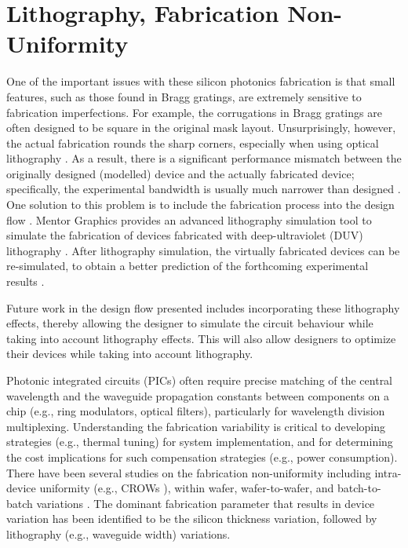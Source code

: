\documentclass[journal]{spie}
\begin{document}
\section{Lithography, Fabrication Non-Uniformity}


One of the important issues with these silicon photonics fabrication is that small features, such as those found in Bragg gratings, are extremely sensitive to fabrication imperfections. For example, the corrugations in Bragg gratings are often designed to be square in the original mask layout. Unsurprisingly, however, the actual fabrication rounds the sharp corners, especially when using optical lithography \cite{wang2011uniform}. As a result, there is a significant performance mismatch between the originally designed (modelled) device and the actually fabricated device; specifically, the experimental bandwidth is usually much narrower than designed \cite{wang2011uniform}.    One solution to this problem is to include the fabrication process into the design flow \cite{bogaerts2008closed-loop}. Mentor Graphics provides an advanced lithography simulation tool to simulate the fabrication of devices fabricated with deep-ultraviolet (DUV) lithography \cite{adam2003improved}. After lithography simulation, the virtually fabricated devices can be re-simulated, to obtain a better prediction of the forthcoming experimental results \cite{wang2012lithography}.  

Future work in the design flow presented includes incorporating these lithography effects, thereby allowing the designer to simulate the circuit behaviour while taking into account lithography effects.  This will also allow designers to optimize their devices while taking into account lithography.

Photonic integrated circuits (PICs) often require precise matching of the central wavelength and the waveguide propagation constants between components on a chip (e.g., ring modulators, optical filters), particularly for wavelength division multiplexing.  Understanding the fabrication variability is critical to developing strategies (e.g., thermal tuning) for system implementation, and for determining the cost implications for such compensation strategies (e.g., power consumption). 
There have been several studies on the fabrication non-uniformity including intra-device uniformity (e.g., CROWs \cite{cooper2010235-ring}), within wafer, wafer-to-wafer, and batch-to-batch variations \cite{zortman2010silicon, krishnamoorthy2011exploiting, selvaraja2010subnanometer, wang2012narrow-band}.   The dominant fabrication parameter that results in device variation has been identified to be the silicon thickness variation, followed by lithography (e.g., waveguide width) variations.
\end{document}
